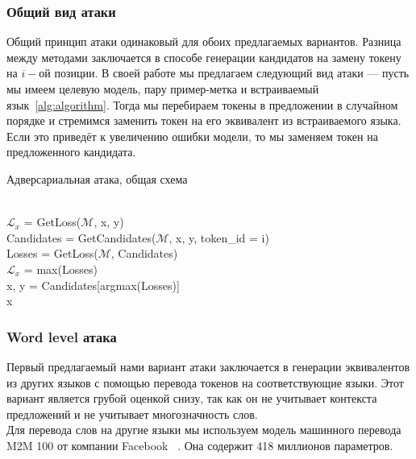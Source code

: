 \subsubsection{Общий вид атаки}
Общий принцип атаки одинаковый для обоих предлагаемых вариантов.
Разница между методами заключается в способе генерации кандидатов на замену токену на $i-$ой позиции.
В своей работе мы предлагаем следующий вид атаки — пусть мы имеем целевую модель, пару пример-метка и встраиваемый язык~\eqref{alg:algorithm}.
Тогда мы перебираем токены в предложении в случайном порядке и стремимся заменить токен на его эквивалент из встраиваемого языка.
Если это приведёт к увеличению ошибки модели, то мы заменяем токен на предложенного кандидата.

\begin{algorithm}
    \caption{Адверсариальная атака, общая схема}
    \begin{algorithmic}
         \\
        $\mathcal{L}_{x}$ = GetLoss($\mathcal{M}$, x, y)
            \\
            \ind Candidates = GetCandidates($\mathcal{M}$, x, y, token\_id = i) \\
            \ind Losses = GetLoss($\mathcal{M}$, Candidates)
            \ind{}
                    \\
                    \ind\ind$\mathcal{L}_{x}$ = max(Losses) \\
                    \ind\ind x, y = Candidates[argmax(Losses)]
            \EndIf
        \EndFor \\
        \ind\Return x
    \end{algorithmic}\label{alg:algorithm}
\end{algorithm}

\subsubsection{Word level атака}
Первый предлагаемый нами вариант атаки заключается в генерации эквивалентов из других языков с помощью перевода токенов на соответствующие языки.
Этот вариант является грубой оценкой снизу, так как он не учитывает контекста предложений и не учитывает многозначность слов. \\
Для перевода слов на другие языки мы используем модель машинного перевода M2M 100 от компании Facebook ~\cite{Fan2020BeyondEM}.
Она содержит 418 миллионов параметров.

